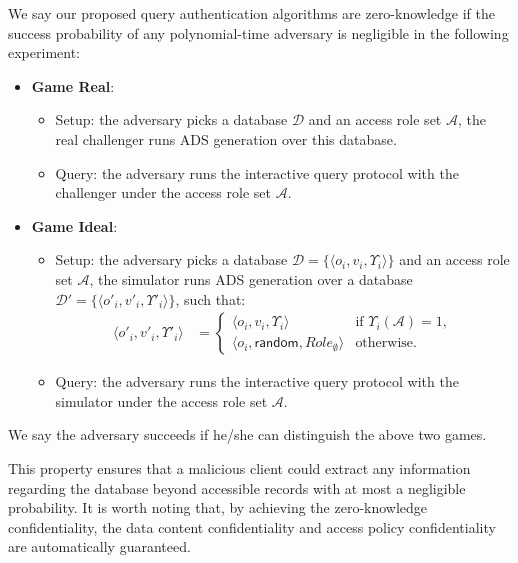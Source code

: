 \begin{definition}\label{def:access-control:query-zero-knowledge}
  We say our proposed query authentication algorithms are zero-knowledge if the success probability of any polynomial-time adversary is negligible in the following experiment:
  \begin{itemize}
    \item \textbf{Game Real}:
      \begin{itemize}
        \item Setup: the adversary picks a database $\mathcal{D}$ and an access role set $\mathcal{A}$, the real challenger runs ADS generation over this database.
        \item Query: the adversary runs the interactive query protocol with the challenger under the access role set $\mathcal{A}$.
      \end{itemize}
    \item \textbf{Game Ideal}:
      \begin{itemize}
        \item Setup: the adversary picks a database $\mathcal{D} = \{\langle o_i, v_i, \Upsilon_i\rangle\}$ and an access role set $\mathcal{A}$, the simulator runs ADS generation over a database $\mathcal{D}'= \{\langle o'_i, v'_i, \Upsilon'_i\rangle\}$, such that:
        \begin{align*}
          \langle o'_i, v'_i, \Upsilon'_i\rangle &= \left\{%
          \begin{array}{ll}
          \langle o_i, v_i, \Upsilon_i \rangle & \text{if }\Upsilon_i(\mathcal{A}) = 1, \\
          \langle o_i, \textsf{random}, {Role}_{\emptyset}\rangle & \text{otherwise.}
          \end{array}%
          \right.%
        \end{align*}
        \item Query: the adversary runs the interactive query protocol with the simulator under the access role set $\mathcal{A}$.
      \end{itemize}
  \end{itemize}
  We say the adversary succeeds if he/she can distinguish the above two games.
\end{definition}

This property ensures that a malicious client could extract any information regarding the database beyond accessible records with at most a negligible probability. It is worth noting that, by achieving the zero-knowledge confidentiality, the data content confidentiality and access policy confidentiality are automatically guaranteed.

